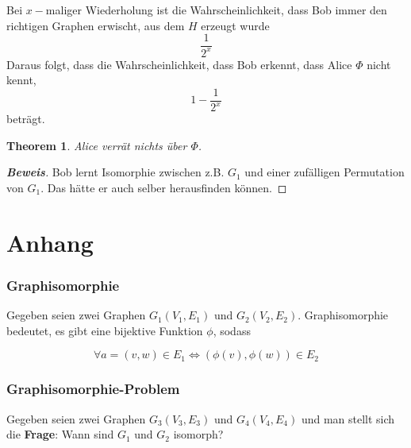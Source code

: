 \documentclass{scrartcl}%
\newtheorem{theorem}{Theorem}
\begin{document}
    Bei $x-$maliger Wiederholung ist die Wahrscheinlichkeit, dass Bob immer den richtigen Graphen erwischt, aus dem $H$ erzeugt wurde
    \begin{equation*}
        \frac{1}{2^x}
    \end{equation*}
    Daraus folgt, dass die Wahrscheinlichkeit, dass Bob erkennt, dass Alice $\Phi$ nicht kennt,
    \begin{equation*}
        1-\frac{1}{2^x}
    \end{equation*}
    beträgt.

    \begin{theorem}
        Alice verrät nichts über $\Phi$.
    \end{theorem}

    \begin{proof}[\textbf{Beweis}]
        Bob lernt Isomorphie zwischen z.B. $G_1$ und einer zufälligen Permutation von $G_1$.
        Das hätte er auch selber herausfinden können.
    \end{proof}

    \hrulefill

    \section*{Anhang}
    \label{sec:anhang}

    \subsubsection*{Graphisomorphie}

    Gegeben seien zwei Graphen $G_1(V_1, E_1)$ und $G_2(V_2, E_2)$.
    Graphisomorphie bedeutet, es gibt eine bijektive Funktion $\phi$, sodass

    \begin{equation*}
        \forall a = (v,w) \in E_1 \Leftrightarrow (\phi(v), \phi(w)) \in E_2
    \end{equation*}

    \subsubsection*{Graphisomorphie-Problem}

    Gegeben seien zwei Graphen $G_3(V_3, E_3)$ und $G_4(V_4, E_4)$ und man stellt sich die \textbf{\textsf{Frage}}:
    Wann sind $G_1$ und $G_2$ isomorph?
\end{document}
